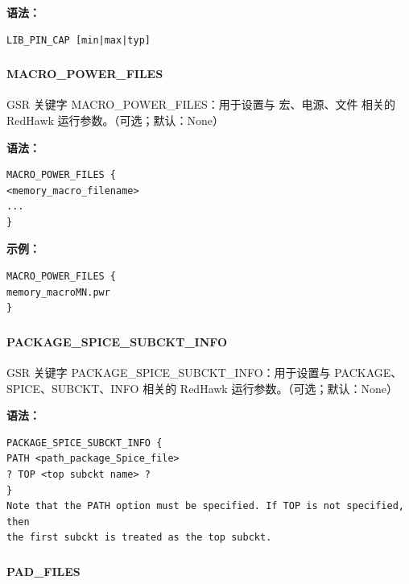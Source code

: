 \textbf{语法：}
\begin{lstlisting}
LIB_PIN_CAP [min|max|typ]
\end{lstlisting}

\subsubsection{}
\paragraph*{MACRO_POWER_FILES}

GSR 关键字 MACRO_POWER_FILES：用于设置与 宏、电源、文件 相关的 RedHawk 运行参数。（可选；默认：None）

\textbf{语法：}
\begin{lstlisting}
MACRO_POWER_FILES {
<memory_macro_filename>
...
}
\end{lstlisting}

\textbf{示例：}
\begin{lstlisting}
MACRO_POWER_FILES {
memory_macroMN.pwr
}
\end{lstlisting}

\subsubsection{}
\paragraph*{PACKAGE_SPICE_SUBCKT_INFO}

GSR 关键字 PACKAGE_SPICE_SUBCKT_INFO：用于设置与 PACKAGE、SPICE、SUBCKT、INFO 相关的 RedHawk 运行参数。（可选；默认：None）

\textbf{语法：}
\begin{lstlisting}
PACKAGE_SPICE_SUBCKT_INFO {
PATH <path_package_Spice_file>
? TOP <top subckt name> ?
}
Note that the PATH option must be specified. If TOP is not specified, then
the first subckt is treated as the top subckt.
\end{lstlisting}

\subsubsection{}
\paragraph*{PAD_FILES}

